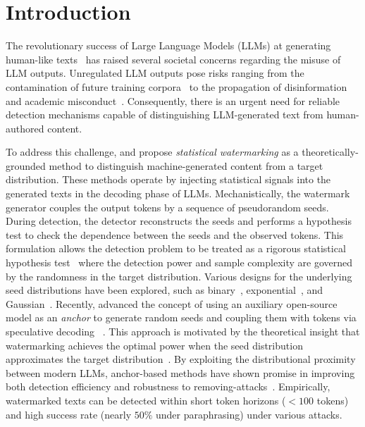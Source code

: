 \section{Introduction}

The revolutionary success of Large Language Models (LLMs) at generating human-like texts~\citep{brown2020language,bubeck2023sparks,chowdhery2023palm} has raised several societal concerns regarding the misuse of LLM outputs. Unregulated LLM outputs pose risks ranging from the contamination of future training corpora~\citep{shumailov2023curse,das2024under} to the propagation of disinformation~\citep{zellers2019defending,vincent2022ai} and academic misconduct~\citep{jarrah2023using,milano2023large}. Consequently, there is an urgent need for reliable detection mechanisms capable of distinguishing LLM-generated text from human-authored content.

To address this challenge, \citet{aaronson2022my} and \citet{kirchenbauer2023watermark} propose \emph{statistical watermarking} as a theoretically-grounded method to distinguish machine-generated content from a target distribution. These methods operate by injecting statistical signals into the generated texts in the decoding phase of LLMs. Mechanistically, the watermark generator couples the output tokens by a sequence of pseudorandom seeds. During detection, the detector reconstructs the seeds and performs a hypothesis test to check the dependence between the seeds and the observed tokens. This formulation allows the detection problem to be treated as a rigorous statistical hypothesis test~\citep{huang2023towards} where the detection power and sample complexity are governed by the randomness in the target distribution. 
Various designs for the underlying seed distributions have been explored, such as binary~\citep{christ2023undetectable}, exponential~\citep{kuditipudi2023robust}, and Gaussian~\citep{block2025gaussmark}.  Recently,  \citet{huang2025watermarking} advanced the concept of using an auxiliary open-source model as an \emph{anchor} to generate random
seeds and coupling them with tokens via speculative decoding ~\citep{leviathan2023fast}. This approach is motivated by the theoretical insight that watermarking achieves the optimal power when the seed distribution approximates the target distribution~\citep{huang2023towards}. By exploiting the distributional proximity between modern LLMs, anchor-based methods have shown promise in improving both detection efficiency
and robustness to removing-attacks~\citep{piet2023mark}. 
Empirically, watermarked texts can be detected within short token horizons ($<100$ tokens) and high success rate (nearly $50\%$ under paraphrasing) under various attacks.


